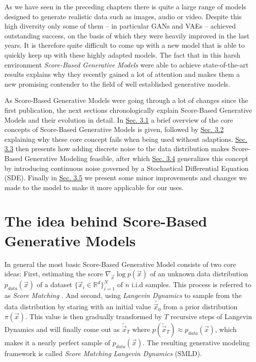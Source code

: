 As we have seen in the preceding chapters there is quite a large range of models designed to generate realistic data such as images, audio or video. Despite this high diversity only some of them – in particular GANs and VAEs – achieved outstanding success, on the basis of which they were heavily improved in the last years. It is therefore quite difficult to come up with a new model that is able to quickly keep up with these highly adapted models. The fact that in this harsh environment \textit{Score-Based Generative Models} \cite{score_1, score_3, score_2} were able to achieve state-of-the-art results explains why they recently gained a lot of attention and makes them a new promising contender to the field of well established generative models.

As Score-Based Generative Models were going through a lot of changes since the first publication, the next sections chronologically explain Score-Based Generative Models and their evolution in detail. In \hyperref[sec:3.1]{Sec. 3.1} a brief overview of the core concepts of Score-Based Generative Models is given, followed by \hyperref[sec:3.2]{Sec. 3.2} explaining why these core concept fails when being used without adaptions. \hyperref[sec:3.3]{Sec. 3.3} then presents how adding discrete noise to the data distribution makes Score-Based Generative Modeling feasible, after which \hyperref[sec:3.4]{Sec. 3.4} generalizes this concept by introducing continuous noise governed by a Stochastical Differential Equation (SDE). Finally in \hyperref[sec:3.5]{Sec. 3.5} we present some minor improvements and changes we made to the model to make it more applicable for our uses.

\section{The idea behind Score-Based Generative Models} \label{sec:3.1}
In general the most basic Score-Based Generative Model consists of two core ideas: First, estimating the score $\nabla_{\vec{x}}\log p(\vec{x})$ of an unknown data distribution $p_{data}(\vec{x})$ of a dataset $\{\vec{x}_i\in \mathbb{R}^d\}_{i=1}^N$ of $n$ i.i.d samples. This process is referred to as \textit{Score Matching} \cite{score_matching_original}. And second, using \textit{Langevin Dynamics} \cite{langevin1, langevin2} to sample from the data distribution by staring with an initial value $\tilde{\vec{x}_0}$ from a prior distribution $\pi(\vec{x})$. This value is then gradually transformed by $T$ recursive steps of Langevin Dynamics and will finally come out as $\tilde{\vec{x}}_T$ where $p(\tilde{\vec{x}}_T)\approx p_{data}(\vec{x})$, which makes it a nearly perfect sample of $p_{data}(\vec{x})$. The resulting generative modeling framework is called \textit{Score Matching Langevin Dynamics} (SMLD).
%
